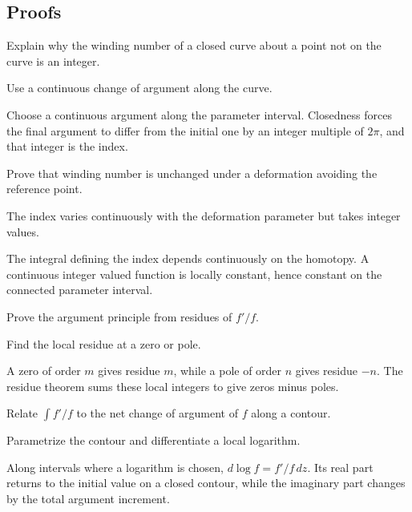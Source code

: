 \subsection*{Proofs}

\begin{exercise}\label{exr:iv12-expand-06}
Explain why the winding number of a closed curve about a point not on the curve is an integer.
\end{exercise}
\begin{hint}
Use a continuous change of argument along the curve.
\end{hint}
\begin{solution}
Choose a continuous argument along the parameter interval. Closedness forces the final argument to differ from the initial one by an integer multiple of \(2\pi\), and that integer is the index.
\end{solution}

\begin{exercise}\label{exr:iv12-expand-07}
Prove that winding number is unchanged under a deformation avoiding the reference point.
\end{exercise}
\begin{hint}
The index varies continuously with the deformation parameter but takes integer values.
\end{hint}
\begin{solution}
The integral defining the index depends continuously on the homotopy. A continuous integer valued function is locally constant, hence constant on the connected parameter interval.
\end{solution}

\begin{exercise}\label{exr:iv12-expand-08}
Prove the argument principle from residues of \(f'/f\).
\end{exercise}
\begin{hint}
Find the local residue at a zero or pole.
\end{hint}
\begin{solution}
A zero of order \(m\) gives residue \(m\), while a pole of order \(n\) gives residue \(-n\). The residue theorem sums these local integers to give zeros minus poles.
\end{solution}

\begin{exercise}\label{exr:iv12-expand-09}
Relate \(\int f'/f\) to the net change of argument of \(f\) along a contour.
\end{exercise}
\begin{hint}
Parametrize the contour and differentiate a local logarithm.
\end{hint}
\begin{solution}
Along intervals where a logarithm is chosen, \(d\log f=f'/f\,dz\). Its real part returns to the initial value on a closed contour, while the imaginary part changes by the total argument increment.
\end{solution}

